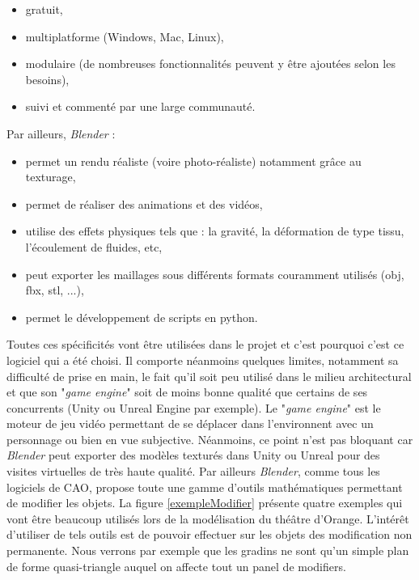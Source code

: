 \begin{itemize}
	\item gratuit,
	\item multiplatforme (Windows, Mac, Linux),
	\item modulaire (de nombreuses fonctionnalités peuvent y être ajoutées selon les besoins),
	\item suivi et commenté par une large communauté.
\end{itemize}
%
Par ailleurs, \textit{Blender} : 
\begin{itemize}
	\item permet un rendu réaliste (voire photo-réaliste) notamment grâce au texturage,
	\item permet de réaliser des animations et des vidéos,
	\item utilise des effets physiques tels que : la gravité, la déformation de type tissu, l'écoulement de fluides, etc,
	\item peut exporter les maillages sous différents formats couramment utilisés (obj, fbx, stl, ...),
	\item permet le développement de scripts en python.
\end{itemize}
%
Toutes ces spécificités vont être utilisées dans le projet et c'est pourquoi c'est ce logiciel qui a été choisi. Il comporte néanmoins quelques limites, notamment sa difficulté de prise en main, le fait qu'il soit peu utilisé dans le milieu architectural et que son "\textit{game engine}" soit de moins bonne qualité que certains de ses concurrents (Unity ou Unreal Engine par exemple). Le "\textit{game engine}" est le moteur de jeu vidéo permettant de se déplacer dans l'environnent avec un personnage ou bien en vue subjective. Néanmoins, ce point n'est pas bloquant car \textit{Blender} peut exporter des modèles texturés dans Unity ou Unreal pour des visites virtuelles de très haute qualité. Par ailleurs \textit{Blender}, comme tous les logiciels de CAO, propose toute une gamme d'outils mathématiques permettant de modifier les objets. La figure \ref{exempleModifier} présente quatre exemples qui vont être beaucoup utilisés lors de la modélisation du théâtre d'Orange. L'intérêt d'utiliser de tels outils est de pouvoir effectuer sur les objets des modification non permanente. Nous verrons par exemple que les gradins ne sont qu'un simple plan de forme quasi-triangle auquel on affecte tout un panel de \glspl{modifier}.\\
%
